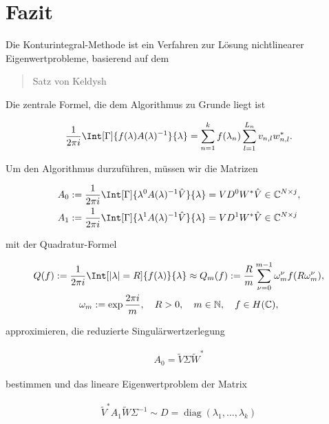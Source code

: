 \chapter{Fazit}

Die Konturintegral-Methode ist ein Verfahren zur Lösung nichtlinearer Eigenwertprobleme, basierend auf dem \blockquote{Satz von Keldysh}.
Die zentrale Formel, die dem Algorithmus zu Grunde liegt ist

\begin{gather*}
    \frac{1}{2 \pi i}
    \Int[\Gamma]{f(\lambda) A(\lambda)^{-1}}{\lambda}
    =
    \sum_{n=1}^k
        f(\lambda_n)
        \sum_{l=1}^{L_n}
            v_{n, l} w_{n, l}^\ast.
\end{gather*}

Um den Algorithmus durzuführen, müssen wir die Matrizen

\begin{align*}
    A_0
    & :=
    \frac{1}{2 \pi i}
    \Int[\Gamma]{\lambda^0 A(\lambda)^{-1} \hat V}{\lambda}
    =
    V D^0 W^\ast \hat V
    \in
    \C^{N \times j}, \\
    A_1
    & :=
    \frac{1}{2 \pi i}
    \Int[\Gamma]{\lambda^1 A(\lambda)^{-1} \hat V}{\lambda}
    =
    V D^1 W^\ast \hat V
    \in
    \C^{N \times j}
\end{align*}

mit der Quadratur-Formel

\begin{gather*}
    Q(f)
    :=
    \frac{1}{2 \pi i}
    \Int[|\lambda| = R]{f(\lambda)}{\lambda}
    \approx
    Q_m(f)
    :=
    \frac{R}{m}
    \sum_{\nu = 0}^{m-1}
        \omega_m^\nu f(R \omega_m^\nu), \\
    \omega_m
    :=
    \exp \frac{2 \pi i}{m},
    \quad
    R > 0,
    \quad
    m \in \N,
    \quad
    f \in H(\C),
\end{gather*}

approximieren, die reduzierte Singulärwertzerlegung

\begin{align*}
    A_0
    =
    \tilde V \Sigma \tilde W^\ast
\end{align*}

bestimmen und das lineare Eigenwertproblem der Matrix

\begin{align*}
    \tilde V^\ast A_1 \tilde W \Sigma^{-1}
    \sim
    D
    =
    \operatorname{diag}(\lambda_1, \dots, \lambda_k)
\end{align*}

